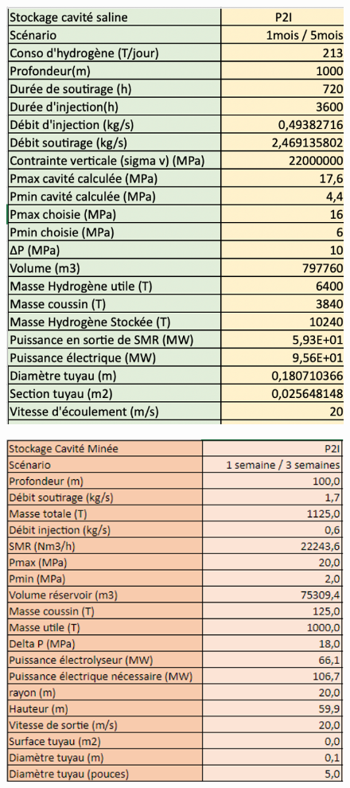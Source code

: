 \documentclass[11pt,french,a4paper]{article}
\begin{document}
\begin{figure}
\centering
\begin{minipage}{.5\textwidth}
  \centering
  \includegraphics[width=0.7\linewidth]{image/annexe/config_cavite_minee/c3.png}
  \label{fig:test1}
\end{minipage}%
\begin{minipage}{.5\textwidth}
  \centering
  \includegraphics[width=0.8\linewidth]{image/annexe/config_cavite_minee/c4.png}
  \label{fig:test2}
\end{minipage}
\end{figure}
\end{document}
